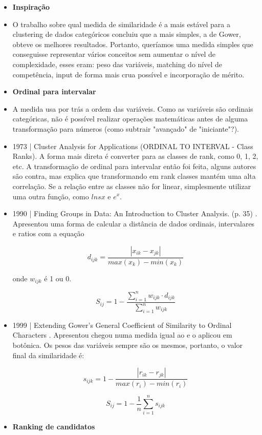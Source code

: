 \documentclass[preprint,12pt]{elsarticle}
\begin{document}
\begin{itemize}
\item \textbf{Inspiração}
\item O trabalho \cite{DOSSANTOS20151247} sobre qual medida de similaridade é a mais estável para a clustering de dados categóricos concluiu que a mais simples, a de Gower, obteve os melhores resultados. Portanto, queríamos uma medida simples que conseguisse representar vários conceitos sem aumentar o nível de complexidade, esses eram: peso das variáveis, matching do nível de competência, input de forma mais crua possível e incorporação de mérito.

\item \textbf{Ordinal para intervalar}
\item A medida usa por trás a ordem das variáveis. Como as variáveis são ordinais categóricas, não é possível realizar operações matemáticas antes de alguma transformação para números (como subtrair "avançado" de "iniciante"?).
\item 1973 | Cluster Analysis for Applications \cite{ANDERBERG197325} (ORDINAL TO INTERVAL - Class Ranks). A forma mais direta é converter para as classes de rank, como 0, 1, 2, etc.  A transformação de ordinal para intervalar então foi feita, alguns autores são contra, mas \cite{ANDERBERG197325} explica que transformando em rank classes mantém uma alta correlação. Se a relação entre as classes não for linear, simplesmente utilizar uma outra função, como $ln sx$ e $e^x$. 

\item 1990 | Finding Groups in Data: An Introduction to Cluster Analysis. (p. 35) \cite{analysis-cluster}. Apresentou uma forma de calcular a distância de dados ordinais, intervalares e ratios com a equação

\begin{equation}
    d_{ijk} =  \frac{|x_{ik} - x_{jk}|}{max(x_k) - min(x_k)}
\end{equation}

onde $w_{ijk}$ é 1 ou 0.

\begin{equation}
    S_{ij} = 1 - \frac{\sum^n_{i=1} w_{ijk} \cdot d_{ijk}}{\sum^n_{i=1} w_{ijk}}
\end{equation}

\item 1999 | Extending Gower's General Coefficient of Similarity to Ordinal Characters  \cite{extending-gower-ordinal}. Apresentou chegou numa medida igual ao \cite{analysis-cluster} e o aplicou em botônica. Os pesos das variáveis sempre são os mesmos, portanto, o valor final da similaridade é:

\begin{equation}
    s_{ijk} =  1 - \frac{|r_{ik} - r_{jk}|}{max(r_i) - min(r_i)}
\end{equation}

\begin{equation}
    S_{ij} =  1 - \frac{1}{n}\sum^n_{i=1}s_{ijk}
\end{equation}


\item \textbf{Ranking de candidatos}
\end{itemize}
\end{document}
